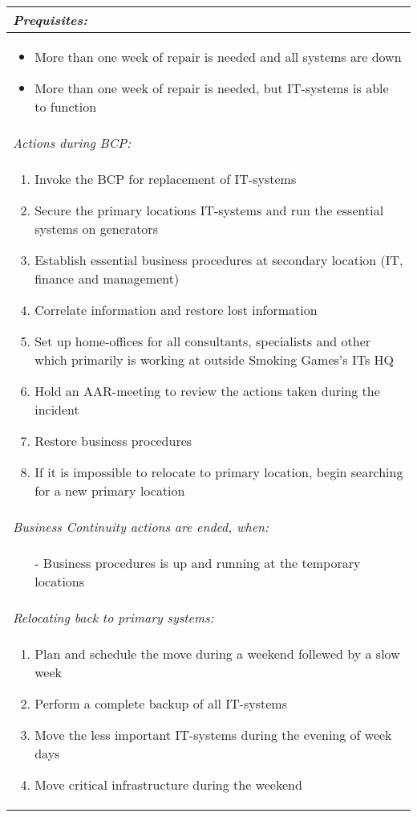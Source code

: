 \begin{longtable}{| p{13cm} |}
	\emph{Prequisites:}\\\hline
	\begin{itemize}
		\item More than one week of repair is needed and all systems are down
		\item More than one week of repair is needed, but IT-systems is able to function
	\end{itemize}
	\\\hline
	\emph{Actions during BCP:}\\\hline
	\begin{enumerate}
		\item Invoke the BCP for replacement of IT-systems
		\item Secure the primary locations IT-systems and run the essential systems on generators
		\item Establish essential business procedures at secondary location (IT, finance and management)
		\item Correlate information and restore lost information
		\item Set up home-offices for all consultants, specialists and other which primarily is working at outside Smoking Games's ITs HQ
		\item Hold an AAR-meeting to review the actions taken during the incident
		\item Restore business procedures
		\item If it is impossible to relocate to primary location, begin searching for a new primary location
	\end{enumerate}\\\hline
	\emph{Business Continuity actions are ended, when:}\\\hline
	\begin{itemize}
		\item[-] Business procedures is up and running at the temporary locations
	\end{itemize}\\\hline
	\emph{Relocating back to primary systems:}\\\hline
	\begin{enumerate}
		\item Plan and schedule the move during a weekend follewed by a slow week
		\item Perform a complete backup of all IT-systems
		\item Move the less important IT-systems during the evening of week days
		\item Move critical infrastructure during the weekend

\end{enumerate}
\end{longtable}
